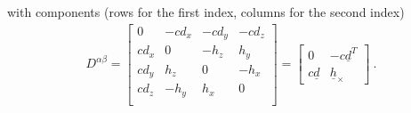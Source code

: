 \documentclass[letterpaper,10pt,english]{jupyterBook}
\begin{document}
\sphinxAtStartPar
with components (rows for the first index, columns for the second index)
\begin{equation*}
\begin{split}D^{\alpha \beta} = 
  \begin{bmatrix}     0 & -c d_x & - c d_y & - c d_z \\
                  c d_x &      0 & -   h_z &     h_y \\
                  c d_y &    h_z &       0 & -   h_x \\
                  c d_z & -  h_y &     h_x &       0 \\
  \end{bmatrix} =
  \begin{bmatrix} 0 & - c \underline{d}^T \\ c \underline{d} & \underline{h}_{\times}
  \end{bmatrix} \ .
\end{split}
\end{equation*}
\end{document}
